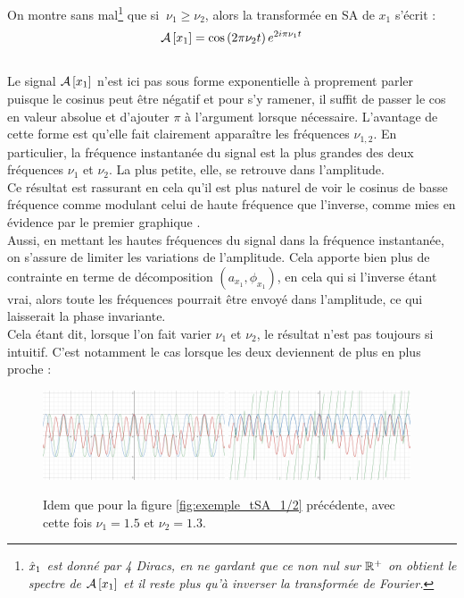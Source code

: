 \noindent
On montre sans mal\footnote{\itshape
	$\hat{x}_1$ est donné par 4 Diracs, en ne gardant que ce non nul sur $\mathbb{R}^+$ on obtient le spectre de $\mathcal{A}\left[x_1\right]$ et il reste plus qu'à inverser la transformée de Fourier.}
que si $\ \nu_1\geq\nu_2$, alors la transformée en SA de $x_1$ s'écrit :
\[\mathcal{A}\left[x_1\right] = \cos \left(2\pi\nu_2 t\right) e^{2i \pi\nu_1 t}\]
\\
Le signal $\mathcal{A}\left[x_1\right]$ n'est ici pas sous forme exponentielle à proprement parler puisque le cosinus peut être négatif et pour s'y ramener, il suffit de passer le cos en valeur absolue et d'ajouter $\pi$ à l'argument lorsque nécessaire. L’avantage de cette forme est qu'elle fait clairement apparaître les fréquences $\nu_{1,2}$. En particulier, la fréquence instantanée du signal est la plus grandes des deux fréquences $\nu_1$ et $\nu_2$. La plus petite, elle, se retrouve dans l'amplitude. 
\\
Ce résultat est rassurant en cela qu'il est plus naturel de voir le cosinus de basse fréquence comme modulant celui de haute fréquence que l'inverse, comme mies en évidence par le premier graphique . 
\\
Aussi, en mettant les hautes fréquences du signal dans la fréquence instantanée, on s'assure de limiter les variations de l'amplitude. Cela apporte bien plus de contrainte en terme de décomposition $(a_{x_1},\phi_{x_1})$, en cela qui si l'inverse étant vrai, alors toute les fréquences pourrait être envoyé dans l'amplitude, ce qui laisserait la phase invariante.
\\

Cela étant dit, lorsque l'on fait varier $\nu_1$ et $\nu_2$, le résultat n'est pas toujours si intuitif. C'est notamment le cas lorsque les deux deviennent de plus en plus proche :

\begin{figure}[h]\centering
	\includegraphics[width=0.48\textwidth]{fig/part-1/ex SA - 21.png}
		\hfill
	\includegraphics[width=0.48\textwidth]{fig/part-1/ex SA - 22.png}
	\caption{\DONE Idem que pour la figure \ref{fig:exemple_tSA_1/2} précédente, avec cette fois $\nu_1=1.5$ et $\nu_2=1.3$.}
	\label{fig:exemple_tSA_2/2}
\end{figure}

